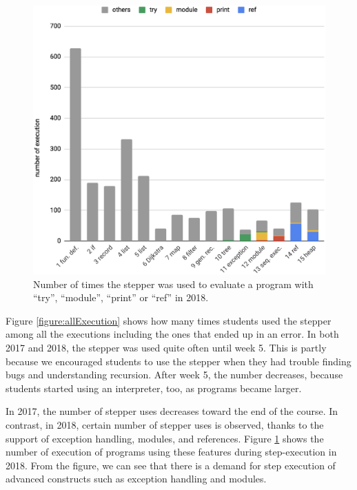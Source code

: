 \begin{figure}[!t]
  \begin{center}
    \includegraphics[width=15cm]{6/table1b.eps}
    \caption{Number of times the stepper was used to evaluate a program with ``try'', ``module'', ``print'' or ``ref'' in 2018.}
    \label{figure:stepExecution}
  \end{center}
\end{figure}

Figure \ref{figure:allExecution} shows how many times students used the stepper among all the executions including the ones that ended up in an error.
In both 2017 and 2018, the stepper was used quite often until week 5.
This is partly because
we encouraged students to use the stepper when they had
trouble finding bugs and understanding recursion.
After week 5, the number decreases, because students started using an
interpreter, too, as programs became larger.

In 2017, the number of stepper uses decreases toward the end of the
course.
In contrast, in 2018, certain number of stepper uses is observed,
thanks to the support of exception handling, modules, and references.
Figure \ref{figure:stepExecution} shows the number of execution of programs using these features during step-execution in 2018. %
From the figure, we can see that there is a demand for step
execution of advanced constructs such as exception handling and
modules.

